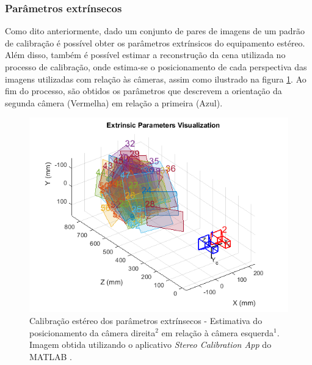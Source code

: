 \subsubsection{Parâmetros extrínsecos}

Como dito anteriormente, dado um conjunto de pares de imagens de um padrão de calibração é possível obter os parâmetros extrínsicos do equipamento estéreo. Além disso, também é possível estimar a reconstrução da cena utilizada no processo de calibração, onde estima-se o posicionamento de cada perspectiva das imagens utilizadas com relação às câmeras, assim como ilustrado na figura \ref{stereo_calib_extrinsic}. Ao fim do processo, são obtidos os parâmetros que descrevem a orientação da segunda câmera (Vermelha) em relação a primeira (Azul).

\begin{figure}[H]
 	\centering
 	\includegraphics[scale=0.70]{./Resources/stereo_calib_extrinsic.png}
 	\caption{Calibração estéreo dos parâmetros extrínsecos - Estimativa do posicionamento da câmera direita$^2$ em relação à câmera esquerda$^1$. Imagem obtida utilizando o aplicativo \textit{Stereo Calibration App} do MATLAB \cite{MatlabStereoApp}.}
 	\label{stereo_calib_extrinsic}
\end{figure}


